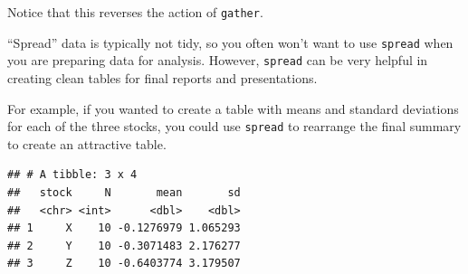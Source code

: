 \documentclass[]{book}
\makeatletter
\newenvironment{Shaded}{\begin{snugshade}}{\end{snugshade}}
\newcommand{\KeywordTok}[1]{\textcolor[rgb]{0.13,0.29,0.53}{\textbf{#1}}}
\newcommand{\DataTypeTok}[1]{\textcolor[rgb]{0.13,0.29,0.53}{#1}}
\newcommand{\DecValTok}[1]{\textcolor[rgb]{0.00,0.00,0.81}{#1}}
\newcommand{\StringTok}[1]{\textcolor[rgb]{0.31,0.60,0.02}{#1}}
\newcommand{\OperatorTok}[1]{\textcolor[rgb]{0.81,0.36,0.00}{\textbf{#1}}}
\newcommand{\NormalTok}[1]{#1}
\newenvironment{kframe}{%
\medskip{}
\setlength{\fboxsep}{.8em}
 \def\at@end@of@kframe{}%
 \ifinner\ifhmode%
  \def\at@end@of@kframe{\end{minipage}}%
  \begin{minipage}{\columnwidth}%
 \fi\fi%
 \def\FrameCommand##1{\hskip\@totalleftmargin \hskip-\fboxsep
 \colorbox{shadecolor}{##1}\hskip-\fboxsep
     \hskip-\linewidth \hskip-\@totalleftmargin \hskip\columnwidth}%
 \MakeFramed {\advance\hsize-\width
   \@totalleftmargin\z@ \linewidth\hsize
   \@setminipage}}%
 {\par\unskip\endMakeFramed%
 \at@end@of@kframe}
\renewenvironment{Shaded}{\begin{kframe}}{\end{kframe}}
\theoremstyle{definition}
\theoremstyle{definition}
\theoremstyle{definition}
\theoremstyle{remark}
\makeatother
\begin{document}
Notice that this reverses the action of \texttt{gather}.

``Spread'' data is typically not tidy, so you often won't want to use
\texttt{spread} when you are preparing data for analysis. However,
\texttt{spread} can be very helpful in creating clean tables for final
reports and presentations.

For example, if you wanted to create a table with means and standard
deviations for each of the three stocks, you could use \texttt{spread}
to rearrange the final summary to create an attractive table.

\begin{Shaded}
\end{Shaded}

\begin{verbatim}
## # A tibble: 3 x 4
##   stock     N       mean       sd
##   <chr> <int>      <dbl>    <dbl>
## 1     X    10 -0.1276979 1.065293
## 2     Y    10 -0.3071483 2.176277
## 3     Z    10 -0.6403774 3.179507
\end{verbatim}

\begin{Shaded}
\end{Shaded}
\end{document}
